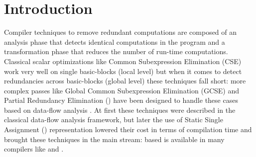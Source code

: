 \documentclass[sigplan,10pt,review,anonymous]{acmart}\settopmatter{printfolios=true,printccs=false,printacmref=false}
\begin{document}



\maketitle


\section{Introduction}

\label{sec:intro}
Compiler techniques to remove redundant computations are composed of an analysis
phase that detects identical computations in the program and a transformation
phase that reduces the number of run-time computations.  Classical scalar
optimizations like Common Subexpression Elimination (CSE) \cite{dragonbook} work
very well on single basic-blocks (local level) but when it comes to detect
redundancies across basic-blocks (global level) these techniques fall short:
more complex passes like Global Common Subexpression Elimination (GCSE) and
Partial Redundancy Elimination (\PRE{}) have been designed to handle these cases
based on data-flow analysis \cite{morel1979global}.  At first these techniques
were described in the classical data-flow analysis framework, but later the use
of Static Single Assignment (\SSA{}) representation lowered their cost in terms
of compilation time \cite{briggs1994effective,chow1997new,kennedy1999partial}
and brought these techniques in the main stream: \SSA{} based \PRE{} is
available in many compilers like \GCC{} and \LLVM{}.
\end{document}
